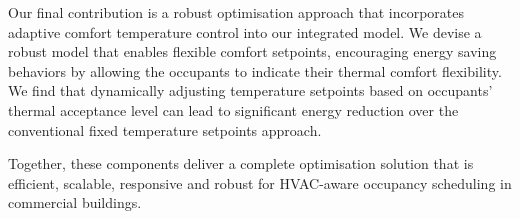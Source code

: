 \documentclass{article}
\begin{document}
Our final contribution is a robust optimisation approach that incorporates adaptive comfort temperature control into our integrated model. We devise a robust model that enables flexible comfort setpoints, encouraging energy saving behaviors by allowing the occupants to indicate their thermal comfort flexibility. We find that dynamically adjusting temperature setpoints based on occupants' thermal acceptance level can lead to significant energy reduction over the conventional fixed temperature setpoints approach.

Together, these components deliver a complete optimisation solution that is efficient, scalable, responsive and robust for HVAC-aware occupancy scheduling in commercial buildings. 
\end{document}
